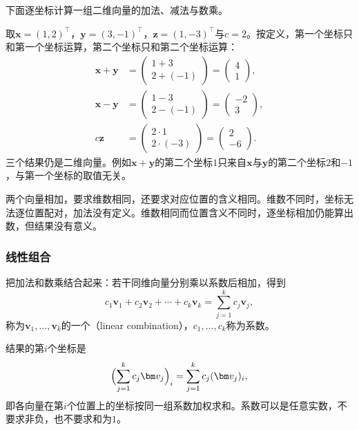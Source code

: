 下面逐坐标计算一组二维向量的加法、减法与数乘。
\begin{example}
\label{ex:ls-vector-addition-scaling}
取$\bm x=(1,2)^\top$，$\bm y=(3,-1)^\top$，$\bm z=(1,-3)^\top$与$c=2$。按定义，第一个坐标只和第一个坐标运算，第二个坐标只和第二个坐标运算：
\[
 \begin{aligned}
 \bm x+\bm y&=\begin{pmatrix}1+3\\2+(-1)\end{pmatrix}=\begin{pmatrix}4\\1\end{pmatrix},\\
 \bm x-\bm y&=\begin{pmatrix}1-3\\2-(-1)\end{pmatrix}=\begin{pmatrix}-2\\3\end{pmatrix},\\
 c\bm z&=\begin{pmatrix}2\cdot1\\2\cdot(-3)\end{pmatrix}=\begin{pmatrix}2\\-6\end{pmatrix}.
 \end{aligned}
\]
三个结果仍是二维向量。例如$\bm x+\bm y$的第二个坐标$1$只来自$\bm x$与$\bm y$的第二个坐标$2$和$-1$，与第一个坐标的取值无关。
\end{example}

两个向量相加，要求维数相同，还要求对应位置的含义相同。维数不同时，坐标无法逐位置配对，加法没有定义。维数相同而位置含义不同时，逐坐标相加仍能算出数，但结果没有意义。

\subsubsection{线性组合}

把加法和数乘结合起来：若干同维向量分别乘以系数后相加，得到
\begin{equation}
 c_1\bm v_1+c_2\bm v_2+\cdots+c_k\bm v_k=\sum_{j=1}^k c_j\bm v_j,
 \label{eq:ls-linear-combination}
\end{equation}
称为$\bm v_1,\ldots,\bm v_k$的一个（linear combination），$c_1,\ldots,c_k$称为系数。

结果的第$i$个坐标是
\[
 \Bigl(\sum_{j=1}^k c_j\bm v_j\Bigr)_i=\sum_{j=1}^k c_j(\bm v_j)_i,
\]
即各向量在第$i$个位置上的坐标按同一组系数加权求和。系数可以是任意实数，不要求非负，也不要求和为$1$。

